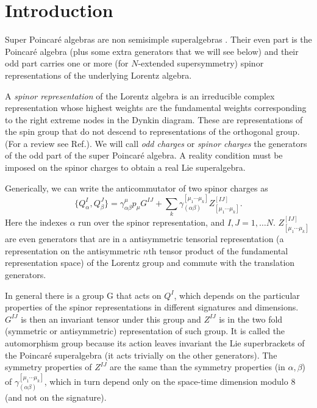 \documentclass[a4paper,12pt]{article}
\begin{document}
\vfill\eject

\section{Introduction}



Super Poincar\'e algebras \cite{wz} are non semisimple
superalgebras  \cite{nrs,ka,bg}.  Their even part is the
Poincar\'e algebra (plus some extra generators that we will see
below) and their odd part carries one   or more (for $N$-extended
supersymmetry) spinor representations of the underlying Lorentz
algebra.

 A {\it spinor representation} of the Lorentz algebra is
an irreducible complex representation whose highest weights are
the fundamental weights corresponding to the right extreme nodes
in the Dynkin diagram. These are representations of the spin group
that do not descend to representations of the orthogonal
group.(For a review see Ref.\cite{st,ca}).
 We will call
{\it odd charges} or {\it spinor charges} the generators of the
odd part of the super Poincar\'e algebra. A reality condition must
be imposed on the spinor charges to obtain a real Lie
superalgebra.

Generically, we can write the anticommutator  of two spinor
charges as
\begin{equation}\{Q^I_\alpha,Q^J_\beta\}=\gamma^\mu_{\alpha\beta}p_\mu G^{IJ}
 +\sum\limits_{k} \gamma^{[\mu_1\cdots
\mu_k]}_{(\alpha \beta)}Z^{[IJ]}_{[\mu_1\cdots \mu_k]}.
\label{ccharges}\end{equation}  Here the indexes $\alpha$ run over
the spinor representation, and $I,J=1,\dots N$.
$Z^{[IJ]}_{[\mu_1\cdots \mu_k]}$ are even generators that are in a
antisymmetric tensorial representation (a representation on the
antisymmetric $n$th tensor product of the fundamental
representation space) of the Lorentz group and commute with the
translation generators.

In general there is a group G that acts on $Q^I$, which depends on
the particular properties of the spinor representations in
different signatures and dimensions. $G^{IJ}$ is then an invariant
tensor under this
 group and $Z^{IJ}$ is in the two fold (symmetric or
 antisymmetric) representation of such group. It is called the
 automorphism group because its action leaves invariant the Lie
 superbrackets of the Poincar\'e superalgebra (it acts trivially on the other generators).
 The
 symmetry properties  of $Z^{IJ}$ are the same than the symmetry
 properties  (in $\alpha,\beta$) of $\gamma^{[\mu_1\cdots
\mu_k]}_{(\alpha \beta)}$, which in turn depend only on the
space-time dimension modulo 8 (and not on the signature).
\end{document}
